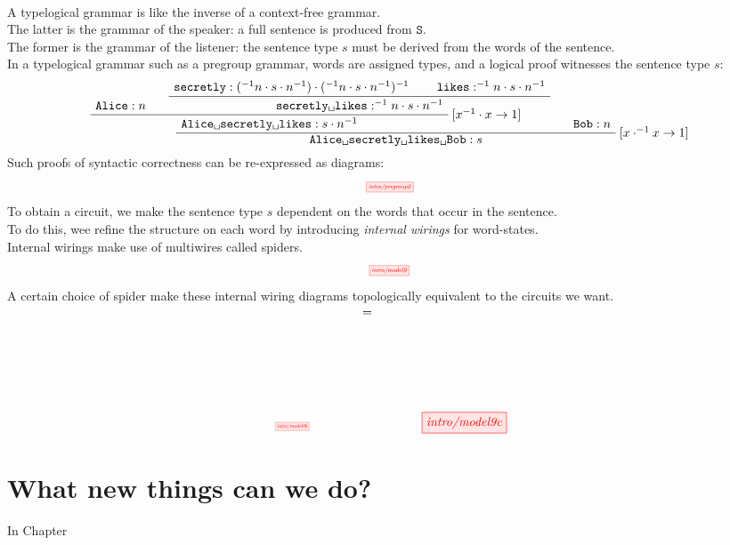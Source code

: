 \begin{fullwidth}
\begin{centering}
\\
A typelogical grammar is like the inverse of a context-free grammar.\\
The latter is the grammar of the speaker: a full sentence is produced from $\texttt{S}$.\\
The former is the grammar of the listener: the sentence type $s$ must be derived from the words of the sentence.\\
In a typelogical grammar such as a pregroup grammar, words are assigned types, and a logical proof witnesses the sentence type $s$:
\[
\AxiomC{$\texttt{Alice} : n$}
\AxiomC{$\texttt{secretly} : (^{-1}n \cdot s \cdot n^{-1}) \cdot (^{-1}n \cdot s \cdot n^{-1})^{-1}$}
\AxiomC{$\texttt{likes} : ^{-1}n \cdot s \cdot n^{-1}$}
\BinaryInfC{$\texttt{secretly\textvisiblespace likes} : ^{-1}n \cdot s \cdot n^{-1}$}
\RightLabel{$[x^{-1} \cdot x \rightarrow 1]$}
\BinaryInfC{$\texttt{Alice\textvisiblespace secretly\textvisiblespace likes} : s \cdot n^{-1}$}
\RightLabel{$[x \cdot ^{-1}x \rightarrow 1]$}
\AxiomC{$\texttt{Bob} : n$}
\BinaryInfC{$\texttt{Alice\textvisiblespace secretly\textvisiblespace likes\textvisiblespace Bob} : s$}
\RightLabel{$[x^{-1} \cdot x \rightarrow 1]$}
\DisplayProof
\]
Such proofs of syntactic correctness can be re-expressed as diagrams:
\[\scalebox{0.5}{\tikzfig{intro/pregroup0}}\]
To obtain a circuit, we make the sentence type $s$ dependent on the words that occur in the sentence.\\
To do this, wee refine the structure on each word by introducing \emph{internal wirings} for word-states.\\
Internal wirings make use of multiwires called spiders.\\
\[\scalebox{0.5}{\tikzfig{intro/model9}}\]
A certain choice of spider make these internal wiring diagrams topologically equivalent to the circuits we want.
\[\scalebox{0.4}{\tikzfig{intro/model9b}} \quad\quad\quad\quad \raisebox{3.2cm}{=} \quad\quad\quad\quad \tikzfig{intro/model9c}\]




\section{What new things can we do?}
In Chapter 

\end{centering}
\end{fullwidth}


